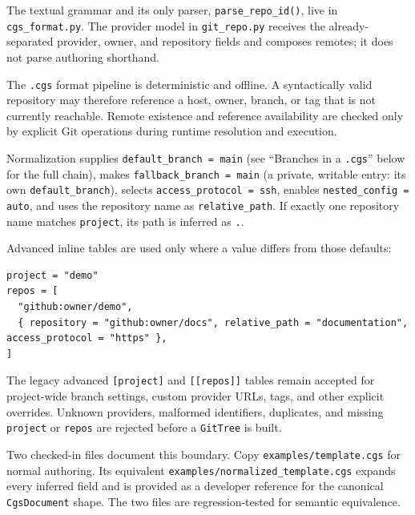 The textual grammar and its only parser, \texttt{parse\_repo\_id()}, live in
\texttt{cgs\_format.py}. The provider model in \texttt{git\_repo.py} receives the
already-separated provider, owner, and repository fields and composes remotes;
it does not parse authoring shorthand.

The \texttt{.cgs} format pipeline is deterministic and offline. A syntactically
valid repository may therefore reference a host, owner, branch, or tag that is
not currently reachable. Remote existence and reference availability are checked
only by explicit Git operations during runtime resolution and execution.

Normalization supplies \texttt{default\_branch = main} (see ``Branches in a
\texttt{.cgs}'' below for the full chain), makes
\texttt{fallback\_branch = main} (a private, writable entry: its own
\texttt{default\_branch}), selects
\texttt{access\_protocol = ssh}, enables \texttt{nested\_config = auto}, and
uses the repository name as \texttt{relative\_path}. If exactly one repository
name matches \texttt{project}, its path is inferred as \texttt{.}.

Advanced inline tables are used only where a value differs from those
defaults:

\begin{lstlisting}
project = "demo"
repos = [
  "github:owner/demo",
  { repository = "github:owner/docs", relative_path = "documentation", access_protocol = "https" },
]
\end{lstlisting}

The legacy advanced \texttt{[project]} and \texttt{[[repos]]} tables remain
accepted for project-wide branch settings, custom provider URLs, tags, and
other explicit overrides.  Unknown providers, malformed identifiers,
duplicates, and missing \texttt{project} or \texttt{repos} are rejected before
a \texttt{GitTree} is built.

Two checked-in files document this boundary. Copy
\texttt{examples/template.cgs} for normal authoring. Its equivalent
\texttt{examples/normalized\_template.cgs} expands every inferred field and is
provided as a developer reference for the canonical \texttt{CgsDocument}
shape. The two files are regression-tested for semantic equivalence.

